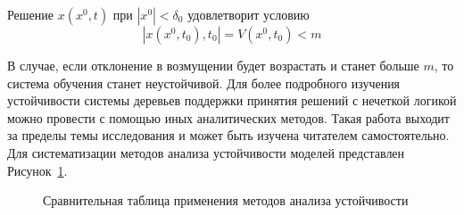 Решение $x(x^0, t)$ при $|x^0|<\delta_0$ удовлетворит условию
\begin{equation}
    \label{eq:equation56}
    |x(x^0,t_0), t_0|  = V(x^0, t_0) < m
\end{equation}

В случае, если отклонение в возмущении будет возрастать и станет больше $m$, то система обучения станет неустойчивой. Для более подробного изучения устойчивости системы деревьев поддержки принятия решений с нечеткой логикой можно провести с помощью иных аналитических методов. Такая работа выходит за пределы темы исследования и может быть изучена читателем самостоятельно. Для систематизации методов анализа устойчивости моделей представлен Рисунок~\cref{fig:Trel}.

\begin{figure}[ht]
    \caption{Сравнительная таблица применения методов анализа устойчивости}\label{fig:Trel}
\end{figure}

